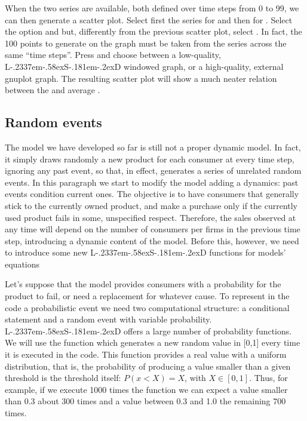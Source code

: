 \documentclass [11pt,a4paper] {book}
\def\LsD{{L\kern-.2337em\lower-.58ex\hbox{S}\kern-.181em\lower-.2ex\hbox{D}}\xspace}
\begin{document}
When the two series are available, both defined over time steps from 0 to 99, we can then generate a scatter plot. Select first the series for  and then for . Select the option  and  but, differently from the previous scatter plot, select . In fact, the 100 points to generate on the graph must be taken from the series across the same ``time steps''. Press  and choose between a low-quality, \LsD windowed graph, or a high-quality, external gnuplot graph. The resulting scatter plot will show a much neater relation between the  and average .


\subsection{Random events}

The model we have developed so far is still not a proper dynamic model. In fact, it simply draws randomly a new product for each consumer at every time step, ignoring any past event, so that, in effect, generates a series of unrelated random events. In this paragraph we start to modify the model adding a dynamics: past events condition current ones. The objective is to have consumers that generally stick to the currently owned product, and make a purchase only if the currently used product fails in some, unspecified respect. Therefore, the sales observed at any time will depend on the number of consumers per firms in the previous time step, introducing a dynamic content of the model. Before this, however, we need to introduce some new \LsD functions for models' equations

Let's suppose that the model provides consumers with a probability for the product to fail, or need a replacement for whatever cause. To represent in the code a probabilistic event we need two computational structure: a conditional statement and a random event with variable probability. \LsD offers a large number of probability functions. We will use the  function which generates a new random value in [0,1] every time it is executed in the code. This function provides a real value with a uniform distribution, that is, the probability of producing a value smaller than a given threshold is the threshold itself: $P(x<X)=X$, with $X \in [0,1]$. Thus, for example, if we execute 1000 times the function  we can expect a value smaller than 0.3 about 300 times and a value between 0.3 and 1.0 the remaining 700 times.
\end{document}
